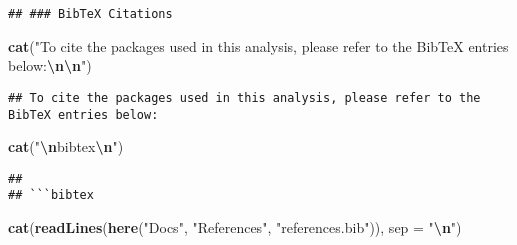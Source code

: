 \documentclass[
]{article}
\newenvironment{Shaded}{\begin{snugshade}}{\end{snugshade}}
\newcommand{\AttributeTok}[1]{\textcolor[rgb]{0.13,0.29,0.53}{#1}}
\newcommand{\FunctionTok}[1]{\textcolor[rgb]{0.13,0.29,0.53}{\textbf{#1}}}
\newcommand{\NormalTok}[1]{#1}
\newcommand{\SpecialCharTok}[1]{\textcolor[rgb]{0.81,0.36,0.00}{\textbf{#1}}}
\newcommand{\StringTok}[1]{\textcolor[rgb]{0.31,0.60,0.02}{#1}}
\begin{document}
\begin{verbatim}
## ### BibTeX Citations
\end{verbatim}

\begin{Shaded}
\begin{Highlighting}[]
\FunctionTok{cat}\NormalTok{(}\StringTok{"To cite the packages used in this analysis, please refer to the BibTeX entries below:}\SpecialCharTok{\textbackslash{}n\textbackslash{}n}\StringTok{"}\NormalTok{)}
\end{Highlighting}
\end{Shaded}

\begin{verbatim}
## To cite the packages used in this analysis, please refer to the BibTeX entries below:
\end{verbatim}

\begin{Shaded}
\begin{Highlighting}[]
\FunctionTok{cat}\NormalTok{(}\StringTok{"}\SpecialCharTok{\textbackslash{}n}\StringTok{\textasciigrave{}\textasciigrave{}\textasciigrave{}bibtex}\SpecialCharTok{\textbackslash{}n}\StringTok{"}\NormalTok{)}
\end{Highlighting}
\end{Shaded}

\begin{verbatim}
## 
## ```bibtex
\end{verbatim}

\begin{Shaded}
\begin{Highlighting}[]
\FunctionTok{cat}\NormalTok{(}\FunctionTok{readLines}\NormalTok{(}\FunctionTok{here}\NormalTok{(}\StringTok{"Docs"}\NormalTok{, }\StringTok{"References"}\NormalTok{, }\StringTok{"references.bib"}\NormalTok{)), }\AttributeTok{sep =} \StringTok{"}\SpecialCharTok{\textbackslash{}n}\StringTok{"}\NormalTok{)}
\end{Highlighting}
\end{Shaded}
\end{document}

